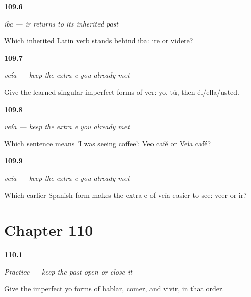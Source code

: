\noindent\begin{minipage}[t]{\linewidth}
\raggedright
\hypertarget{review-ES-C16-ir-imperfecto-history}{\textbf{109.6}} \emph{iba — ir returns to its inherited past}\par
\small Which inherited Latin verb stands behind iba: īre or vidēre?
\end{minipage}\par\medskip

\noindent\begin{minipage}[t]{\linewidth}
\raggedright
\hypertarget{review-ES-C16-ver-imperfecto-singular-forms}{\textbf{109.7}} \emph{veía — keep the extra e you already met}\par
\small Give the learned singular imperfect forms of ver: yo, tú, then él/ella/usted.
\end{minipage}\par\medskip

\noindent\begin{minipage}[t]{\linewidth}
\raggedright
\hypertarget{review-ES-C16-ver-imperfecto-veo-veia}{\textbf{109.8}} \emph{veía — keep the extra e you already met}\par
\small Which sentence means 'I was seeing coffee': Veo café or Veía café?
\end{minipage}\par\medskip

\noindent\begin{minipage}[t]{\linewidth}
\raggedright
\hypertarget{review-ES-C16-ver-imperfecto-extra-e}{\textbf{109.9}} \emph{veía — keep the extra e you already met}\par
\small Which earlier Spanish form makes the extra e of veía easier to see: veer or ir?
\end{minipage}\par\medskip

\section*{Chapter 110}

\noindent\begin{minipage}[t]{\linewidth}
\raggedright
\hypertarget{review-ES-C16-practice-regular-yo-forms}{\textbf{110.1}} \emph{Practice — keep the past open or close it}\par
\small Give the imperfect yo forms of hablar, comer, and vivir, in that order.
\end{minipage}\par\medskip

